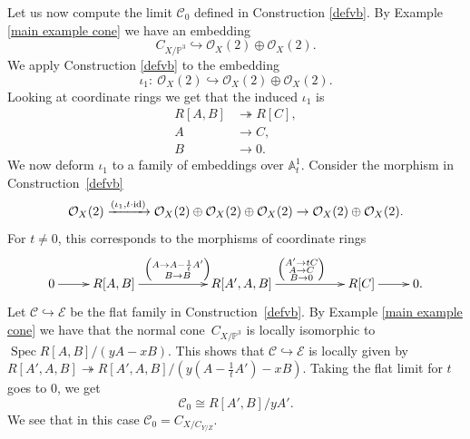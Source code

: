 \documentclass[pdftex]{sigma}
\numberwithin{equation}{section}
\newcommand{\OO}{\mathcal{O}}
\newcommand{\PP}{\mathbb P}
\begin{document}
\begin{Example}\label{limit main example}Let us now compute the limit $\mathcal{C}_0$ defined in Construction \ref{defvb}. By Example \ref{main example cone} we have an embedding
\[
C_{X/\PP^3}\hookrightarrow\OO_X(2)\oplus\OO_X(2).
\]
We apply Construction \ref{defvb} to the embedding
\[\iota_1\colon \ \OO_X(2)\hookrightarrow \OO_X(2)\oplus\OO_X(2).\]
Looking at coordinate rings we get that the induced $\iota_1$ is
\begin{align*}
R[A,B]&\twoheadrightarrow R[C],\\
A&\rightarrow C,\\
B&\rightarrow 0.
\end{align*}
We now deform $\iota_1$ to a family of embeddings over $\mathbb A^1_t$. Consider the morphism in Construction~\ref{defvb}
\[\OO_X(2)\xrightarrow{(\iota_1,t\cdot {\rm id})} \OO_X(2)\oplus\OO_X(2)\oplus\OO_X(2)\rightarrow\OO_X(2)\oplus\OO_X(2).\]
For $t\neq 0$, this corresponds to the morphisms of coordinate rings
\begin{align*}
\xymatrix{0\ar[r] & R[A,B]\ar[rr]^{\left(\substack{A\to A-\frac{1}{t}A'\\ B\to B}\right)} & & R[A',A,B]\ar[rr]^{\left(\substack{A'\to tC\\ A\to C\\ B\to 0}\right)} & & R[C]\ar[r] & 0.}
\end{align*}
Let $\mathcal C\hookrightarrow \mathcal{E}$ be the flat family in Construction~\ref{defvb}. By Example \ref{main example cone} we have that the normal cone~$C_{X/\PP^3}$ is locally isomorphic to $\operatorname{Spec}R[A,B]/(yA-xB)$.
This shows that $\mathcal C\hookrightarrow \mathcal{E}$ is locally given by $R[A',A,B]\twoheadrightarrow R[A',A,B]/(y(A-\frac{1}{t}A')-xB)$.
Taking the flat limit for $t$ goes to $0$, we get
\[\mathcal C_0\cong R[A',B]/yA'.\]
We see that in this case $\mathcal C_0= C_{X/C_{Y/Z}}$.
\end{Example}
\end{document}
